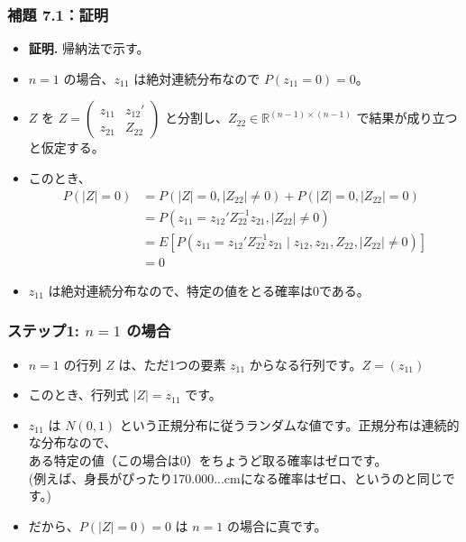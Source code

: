 \documentclass[aspectratio=169]{beamer}
\begin{document}
\begin{frame}
\frametitle{補題 7.1：証明}
\begin{itemize}
    \item \textbf{証明.} 帰納法で示す。
    \item $n=1$ の場合、$z_{11}$ は絶対連続分布なので $P(z_{11}=0)=0$。
    \item $Z$ を $Z=\begin{pmatrix}z_{11}&z_{12}'\\ z_{21}&Z_{22}\end{pmatrix}$ と分割し、$Z_{22}\in\mathbb{R}^{(n-1)\times(n-1)}$ で結果が成り立つと仮定する。
    \item このとき、
    \begin{align*}
        P(|Z|=0) &= P(|Z|=0,|Z_{22}|\ne0) + P(|Z|=0,|Z_{22}|=0) \\
        &= P(z_{11}=z_{12}'Z_{22}^{-1}z_{21},|Z_{22}|\ne0) \\
        &= E[P(z_{11}=z_{12}'Z_{22}^{-1}z_{21} \mid z_{12},z_{21},Z_{22},|Z_{22}|\ne0)] \\
        &= 0
    \end{align*}
    \item $z_{11}$ は絶対連続分布なので、特定の値をとる確率は0である。
\end{itemize}
\end{frame}




\begin{frame}
\frametitle{ステップ1: $n=1$ の場合}
\begin{itemize}
    \item $n=1$ の行列 $Z$ は、ただ1つの要素 $z_{11}$ からなる行列です。$Z=(z_{11})$
    \item このとき、行列式 $|Z|=z_{11}$ です。
    \item $z_{11}$ は $N(0,1)$ という正規分布に従うランダムな値です。正規分布は連続的な分布なので、\\ある特定の値（この場合は0）をちょうど取る確率はゼロです。\\(例えば、身長がぴったり170.000...cmになる確率はゼロ、というのと同じです。)
    \item だから、$P(|Z|=0)=0$ は $n=1$ の場合に真です。
\end{itemize}
\end{frame}
\end{document}

